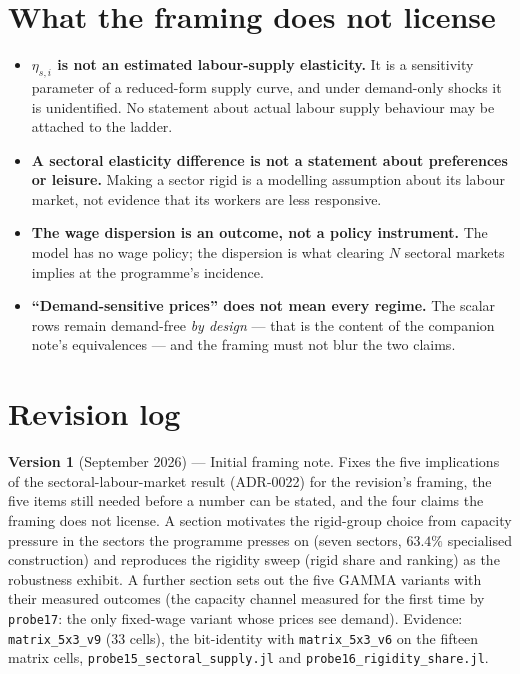 \documentclass[11pt]{article}
\begin{document}
\section{What the framing does not license}

\begin{itemize}
\item \textbf{$\eta_{s,i}$ is not an estimated labour-supply elasticity.} It is
      a sensitivity parameter of a reduced-form supply curve, and under
      demand-only shocks it is unidentified. No statement about actual labour
      supply behaviour may be attached to the ladder.
\item \textbf{A sectoral elasticity difference is not a statement about
      preferences or leisure.} Making a sector rigid is a modelling assumption
      about its labour market, not evidence that its workers are less
      responsive.
\item \textbf{The wage dispersion is an outcome, not a policy instrument.} The
      model has no wage policy; the dispersion is what clearing $N$ sectoral
      markets implies at the programme's incidence.
\item \textbf{``Demand-sensitive prices'' does not mean every regime.} The
      scalar rows remain demand-free \emph{by design} --- that is the content
      of the companion note's equivalences --- and the framing must not blur the
      two claims.
\end{itemize}

\section*{Revision log}

\noindent\textbf{Version 1} (September 2026) --- Initial framing note. Fixes
the five implications of the sectoral-labour-market result (ADR-0022) for the
revision's framing, the five items still needed before a number can be stated,
and the four claims the framing does not license. A section motivates the
rigid-group choice from capacity pressure in the sectors the programme presses
on (seven sectors, $63.4\%$ specialised construction) and reproduces the
rigidity sweep (rigid share and ranking) as the robustness exhibit. A further
section sets out the five GAMMA variants with their measured outcomes (the
capacity channel measured for the first time by \texttt{probe17}: the only
fixed-wage variant whose prices see demand). Evidence:
\texttt{matrix\_5x3\_v9} (33 cells), the bit-identity with
\texttt{matrix\_5x3\_v6} on the fifteen matrix cells,
\texttt{probe15\_sectoral\_supply.jl} and \texttt{probe16\_rigidity\_share.jl}.
\end{document}
